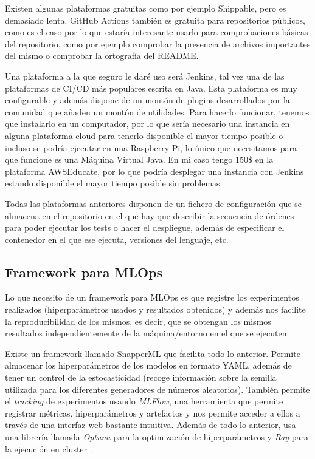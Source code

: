 Existen algunas plataformas gratuitas como por ejemplo Shippable, pero es demasiado lenta. GitHub Actions también es gratuita para repositorios públicos, como es el caso por lo que estaría interesante usarlo para comprobaciones básicas del repositorio, como por ejemplo comprobar la presencia de archivos importantes del mismo o comprobar la ortografía del README.\newline

Una plataforma a la que seguro le daré uso será Jenkins, tal vez una de las plataformas de CI/CD más populares escrita en Java. Esta plataforma es muy configurable y además dispone de un montón de plugins desarrollados por la comunidad que añaden un montón de utilidades. Para hacerlo funcionar, tenemos que instalarlo en un computador, por lo que sería necesario una instancia en alguna plataforma cloud para tenerlo disponible el mayor tiempo posible o incluso se podría ejecutar en una Raspberry Pi, lo único que necesitamos para que funcione es una Máquina Virtual Java. En mi caso tengo 150\$ en la plataforma AWSEducate, por lo que podría desplegar una instancia con Jenkins estando disponible el mayor tiempo posible sin problemas.\newline

Todas las plataformas anteriores disponen de un fichero de configuración que se almacena en el repositorio en el que hay que describir la secuencia de órdenes para poder ejecutar los tests o hacer el despliegue, además de especificar el contenedor en el que ese ejecuta, versiones del lenguaje, etc.

\subsection{Framework para MLOps}

Lo que necesito de un framework para MLOps es que registre los experimentos realizados (hiperparámetros usados y resultados obtenidos) y además nos facilite la reproducibilidad de los mismos, es decir, que se obtengan los mismos resultados independientemente de la máquina/entorno en el que se ejecuten.\newline

Existe un framework llamado SnapperML que facilita todo lo anterior. Permite almacenar los hiperparámetros de los modelos en formato YAML, además de tener un control de la estocasticidad (recoge información sobre la semilla utilizada para los diferentes generadores de números aleatorios). También permite el \textit{tracking} de experimentos usando \textit{MLFlow}, una herramienta que permite registrar métricas, hiperparámetros y artefactos y nos permite acceder a ellos a través de una interfaz web bastante intuitiva. Además de todo lo anterior, usa una librería llamada \textit{Optuna} para la optimización de hiperparámetros y \textit{Ray} para la ejecución en cluster \cite{snapperml}.\newline

